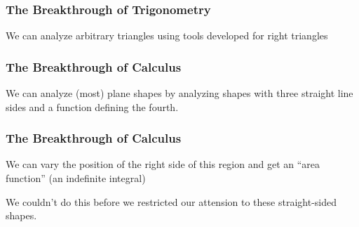 \documentclass{beamer}
\begin{document}
\begin{frame}


\end{frame}

\begin{frame}
\frametitle{The Breakthrough of Trigonometry}

\begin{center}
We can analyze arbitrary triangles using tools developed for right triangles
\end{center}

\end{frame}

\begin{frame}
\frametitle{The Breakthrough of Calculus}

\begin{center}
We can analyze (most) plane shapes by analyzing shapes with three straight line sides
and a function defining the fourth.
\end{center}

\end{frame}

\begin{frame}
\frametitle{The Breakthrough of Calculus}

\begin{center}
We can vary the position of the right side of this region and get an ``area function''
(an indefinite integral)

We couldn't do this before we restricted our attension to these straight-sided shapes.
\end{center}

\end{frame}
\end{document}
